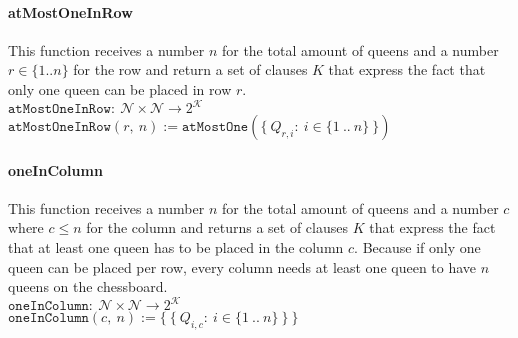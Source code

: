 \paragraph{atMostOneInRow}
This function receives a number $n$ for the total amount of queens and a number $r \in \{1 .. n\}$ for the row and return a set of clauses $K$ that express the fact that only one queen can be placed in row $r$.
\\[0.2cm]
\hspace*{1.3cm} $\texttt{atMostOneInRow}:\ \mathcal{N} \times \mathcal{N} \to 2^{\mathcal{K}}$
\\[0.2cm]
\hspace*{1.3cm} $\texttt{atMostOneInRow}(r,\ n) := \texttt{atMostOne}(\{\ Q_{r,i} :\ i \in \{1\ ..\ n\}\ \})$

\paragraph{oneInColumn}
This function receives a number $n$ for the total amount of queens and a number $c$ where $c \leq n$ for the column and returns a set of clauses $K$ that express the fact that at least one queen has to be placed in the column $c$. Because if only one queen can be placed per row, every column needs at least one queen to have $n$ queens on the chessboard.
\\[0.2cm]
\hspace*{1.3cm} $\texttt{oneInColumn}:\ \mathcal{N} \times \mathcal{N} \to 2^{\mathcal{K}}$
\\[0.2cm]
\hspace*{1.3cm} $\texttt{oneInColumn}(c,\ n) := \{\ \{\ Q_{i,c} :\ i \in \{1\ ..\ n\}\ \}\ \}$

